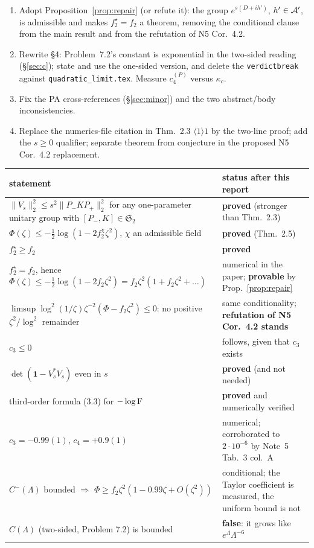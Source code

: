 \documentclass[11pt]{article}
\newcommand{\Stwo}{\mathfrak S_2}\newcommand{\Sone}{\mathfrak S_1}
\newcommand{\Pp}{P_+}\newcommand{\Pm}{P_-}\newcommand{\Om}{\Omega}\newcommand{\one}{\mathbf 1}
\newcommand{\norm}[1]{\lVert#1\rVert}\newcommand{\abs}[1]{\lvert#1\rvert}
\begin{document}
\begin{enumerate}[leftmargin=2.2em]
\item Adopt Proposition~\ref{prop:repair} (or refute it): the group $e^{s(D+ih')}$, $h'\in\mathcal A'$, is
 admissible and makes $f_2^\star=f_2$ a theorem, removing the conditional clause from the main
 result and from the refutation of N5 Cor.~4.2.
\item Rewrite \S4: Problem~7.2's constant is exponential in the two-sided reading
 (\S\ref{sec:c}); state and use the one-sided version, and delete the \texttt{verdictbreak} against
 \texttt{quadratic\_limit.tex}.  Measure $c_4^{(P)}$ versus $\kappa_c$.
\item Fix the PA cross-references (\S\ref{sec:minor}) and the two abstract/body inconsistencies.
\item Replace the numerics-file citation in Thm.~2.3 $\langle1\rangle1$ by the two-line proof; add
 the $s\ge0$ qualifier; separate theorem from conjecture in the proposed N5 Cor.~4.2 replacement.
\end{enumerate}

\begin{center}\small
\begin{tabular}{p{}l}\toprule
statement & status after this report\\\midrule
$\norm{V_s}_2^2\le s^2\norm{\Pm K\Pp}_2^2$ for any one-parameter unitary group with
 $[\Pm,K]\in\Stwo$ & \textbf{proved} (stronger than Thm.~2.3)\\
$\Phi(\zeta)\le-\frac12\log(1-2f_2^\chi\zeta^2)$, $\chi$ an admissible field &
 \textbf{proved} (Thm.~2.5)\\
$f_2^\star\ge f_2$ & \textbf{proved}\\
$f_2^\star=f_2$, hence $\Phi(\zeta)\le-\frac12\log(1-2f_2\zeta^2)=f_2\zeta^2(1+f_2\zeta^2+\dots)$ &
 numerical in the paper; \textbf{provable} by Prop.~\ref{prop:repair}\\
$\limsup\log^2(1/\zeta)\zeta^{-2}(\Phi-f_2\zeta^2)\le0$: no positive $\zeta^2/\log^2$ remainder &
 same conditionality; \textbf{refutation of N5 Cor.~4.2 stands}\\
$c_3\le0$ & follows, given that $c_3$ exists\\
$\det(\one-V_s^*V_s)$ even in $s$ & \textbf{proved} (and not needed)\\
third-order formula (3.3) for $-\log\operatorname{F}$ & \textbf{proved} and numerically verified\\
$c_3=-0.99(1)$, $c_4=+0.9(1)$ & numerical; corroborated to $2\cdot10^{-6}$ by Note~5 Tab.~3 col.~A\\
$C^-(\Lambda)$ bounded $\Rightarrow$ $\Phi\ge f_2\zeta^2(1-0.99\zeta+O(\zeta^2))$ &
 conditional; the Taylor coefficient is measured, the uniform bound is not\\
$C(\Lambda)$ (two-sided, Problem 7.2) is bounded & \textbf{false}: it grows like
 $e^\Lambda\Lambda^{-6}$\\
\bottomrule\end{tabular}\end{center}
\end{document}
